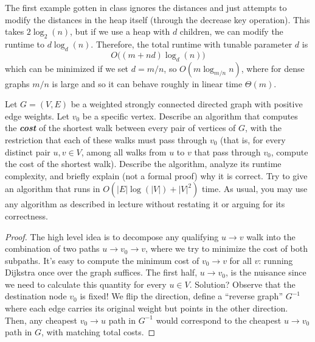 \documentclass{article}
\begin{document}
    The first example gotten in class ignores the distances and just attempts to modify the distances in the heap itself (through the decrease key operation). This takes $2 \log_2 (n)$, but if we use a heap with $d$ children, we can modify the runtime to $d \log_d (n)$. Therefore, the total runtime with tunable parameter $d$ is 
    \begin{equation}
      O\big( (m + nd) \log_d (n)\big)
    \end{equation}
    which can be minimized if we set $d = m/n$, so $O(m \log_{m/n} n)$, where for dense graphs $m/n$ is large and so it can behave roughly in linear time $\Theta(m)$. 

    \begin{exercise}
      Let $G = (V,E)$ be a weighted strongly connected directed graph with positive edge weights. Let $v_0$ be a specific vertex. Describe an algorithm that computes the \textbf{\textit{cost}} of the shortest walk between every pair of vertices of $G$, with the restriction that each of these walks must pass through $v_0$ (that is, for every distinct pair $u, v \in V$, among all walks from $u$ to $v$ that pass through $v_0$, compute the cost of the shortest walk). Describe the algorithm, analyze its runtime complexity, and briefly explain (not a formal proof) why it is correct. Try to give an algorithm that runs in $O (|E|\log(|V|) + |V|^2)$ time. As usual, you may use any algorithm as described in lecture without restating it or arguing for its correctness.
    \end{exercise}
    \begin{proof}
      The high level idea is to decompose any qualifying $u\to v$ walk into the combination of two paths $u\to v_0\to v$, where we try to minimize the cost of both subpaths. It's easy to compute the minimum cost of $v_0\to v$ for all $v$: running Dijkstra once over the graph suffices. The first half, $u\to v_0$, is the nuisance since we need to calculate this quantity for every $u\in V$. Solution? Observe that the destination node $v_0$ is fixed! We flip the direction, define a ``reverse graph'' $G^{-1}$ where each edge carries its original weight but points in the other direction. Then, any cheapest $v_0\to u$ path in $G^{-1}$ would correspond to the cheapest $u\to v_0$ path in $G$, with matching total costs.  
    \end{proof}
\end{document}
